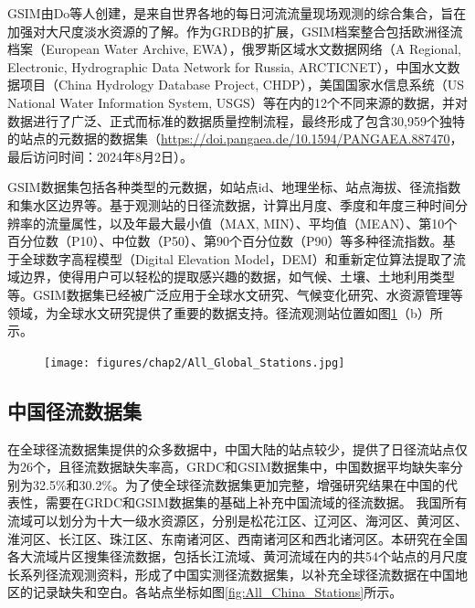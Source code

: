 GSIM由Do等人创建\cite{doGlobalStreamflowIndices2018, gudmundssonGlobalStreamflowIndices2018}，是来自世界各地的每日河流流量现场观测的综合集合，旨在加强对大尺度淡水资源的了解。作为GRDB的扩展，GSIM档案整合包括欧洲径流档案（European Water Archive, EWA），俄罗斯区域水文数据网络（A Regional, Electronic, Hydrographic Data Network for Russia, ARCTICNET），中国水文数据项目（China Hydrology Database Project, CHDP），美国国家水信息系统（US National Water Information System, USGS）等在内的12个不同来源的数据，并对数据进行了广泛、正式而标准的数据质量控制流程，最终形成了包含30,959个独特的站点的元数据的数据集（\href{https://doi.pangaea.de/10.1594/PANGAEA.887470}{https://doi.pangaea.de/10.1594/PANGAEA.887470}，最后访问时间：2024年8月2日）。\par
GSIM数据集包括各种类型的元数据，如站点id、地理坐标、站点海拔、径流指数和集水区边界等。基于观测站的日径流数据，计算出月度、季度和年度三种时间分辨率的流量属性，以及年最大最小值（MAX, MIN）、平均值（MEAN）、第10个百分位数（P10）、中位数（P50）、第90个百分位数（P90）等多种径流指数。基于全球数字高程模型（Digital Elevation Model，DEM）和重新定位算法提取了流域边界，使得用户可以轻松的提取感兴趣的数据，如气候、土壤、土地利用类型等。GSIM数据集已经被广泛应用于全球水文研究、气候变化研究、水资源管理等领域，为全球水文研究提供了重要的数据支持\cite{gudmundssonObservedTrendsGlobal2019}。径流观测站位置如图\ref{fig:All_Global_Stations}（b）所示。\par

\begin{figure}[H]
	\centering
	\texttt{[image: figures/chap2/All\_Global\_Stations.jpg]}
	\label{fig:All_Global_Stations}
\end{figure}

\subsection{中国径流数据集}

在全球径流数据集提供的众多数据中，中国大陆的站点较少，提供了日径流站点仅为26个，且径流数据缺失率高\cite{GouJiaoJiaoJiYuVICDeZhongGuoTianRanJingLiuGuSuanYuPingJie2021}，GRDC和GSIM数据集中，中国数据平均缺失率分别为32.5\%和30.2\%。为了使全球径流数据集更加完整，增强研究结果在中国的代表性，需要在GRDC和GSIM数据集的基础上补充中国流域的径流数据。
我国所有流域可以划分为十大一级水资源区，分别是松花江区、辽河区、海河区、黄河区、淮河区、长江区、珠江区、东南诸河区、西南诸河区和西北诸河区。本研究在全国各大流域片区搜集径流数据，包括长江流域、黄河流域在内的共54个站点的月尺度长系列径流观测资料，形成了中国实测径流数据集，以补充全球径流数据在中国地区的记录缺失和空白。各站点坐标如图\ref{fig:All_China_Stations}所示。\par

